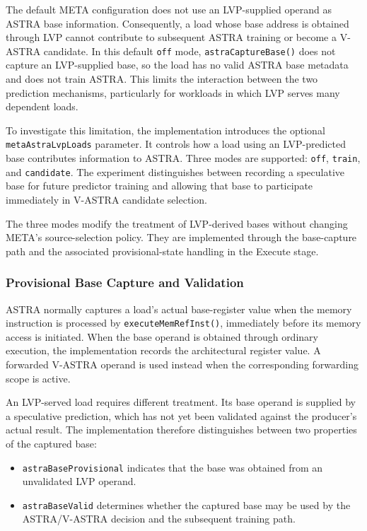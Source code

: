 The default META configuration does not use an LVP-supplied operand
as ASTRA base information. Consequently, a load whose base address
is obtained through LVP cannot contribute to subsequent ASTRA
training or become a V-ASTRA candidate. In this default \texttt{off}
mode, \texttt{astraCaptureBase()} does not capture an LVP-supplied
base, so the load has no valid ASTRA base metadata and does not train
ASTRA. This limits the interaction between the two prediction
mechanisms, particularly for workloads in which LVP serves many
dependent loads.

To investigate this limitation, the implementation introduces the
optional \texttt{metaAstra\allowbreak LvpLoads} parameter. It controls how a
load using an LVP-predicted base contributes information to ASTRA.
Three modes are supported: \texttt{off}, \texttt{train}, and
\texttt{candidate}. The experiment distinguishes between recording
a speculative base for future predictor training and allowing that
base to participate immediately in V-ASTRA candidate selection.

The three modes modify the treatment of LVP-derived bases without
changing META's source-selection policy. They are implemented
through the base-capture path and the associated provisional-state
handling in the Execute stage.

\subsubsection{Provisional Base Capture and Validation}

ASTRA normally captures a load's actual base-register value when
the memory instruction is processed by
\texttt{executeMemRefInst()}, immediately before its memory access
is initiated. When the base operand is obtained through ordinary
execution, the implementation records the architectural register
value. A forwarded V-ASTRA operand is used instead when the
corresponding forwarding scope is active.

An LVP-served load requires different treatment. Its base operand
is supplied by a speculative prediction, which has not yet been
validated against the producer's actual result. The implementation
therefore distinguishes between two properties of the captured
base:

\begin{itemize}
    \item \texttt{astraBaseProvisional} indicates that the base was
    obtained from an unvalidated LVP operand.

    \item \texttt{astraBaseValid} determines whether the captured
    base may be used by the ASTRA/V-ASTRA decision and the
    subsequent training path.
\end{itemize}

